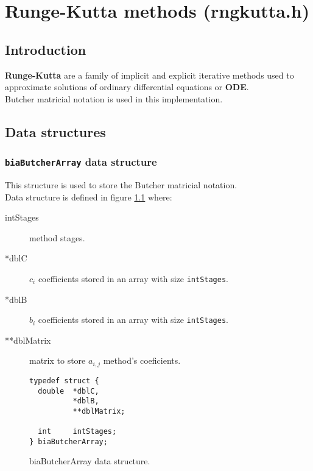 %
%

\chapter{Runge-Kutta methods (rngkutta.h)}

\section{Introduction}

\textbf{Runge-Kutta} are a family of implicit and explicit iterative methods used to approximate solutions of ordinary differential equations or \textbf{ODE}.\\

Butcher matricial notation is used in this implementation.\\

\section{Data structures}

\subsection{\texttt{biaButcherArray} data structure}

This structure is used to store the Butcher matricial notation.\\

Data structure is defined in figure \ref{fig:biaButcherArray} where:
%
\begin{description}
%
\item[intStages] method stages.
%
\item[*dblC] $c_i$ coefficients stored in an array with size \texttt{intStages}.
%
\item[*dblB] $b_i$ coefficients stored in an array with size \texttt{intStages}.
%
\item[**dblMatrix] matrix to store $a_{i,j}$ method's coeficients.  
%
\end{description}

\begin{figure}[!h]
\begin{verbatim}
typedef struct {
  double  *dblC,
          *dblB,
          **dblMatrix;

  int     intStages;
} biaButcherArray;
\end{verbatim}
\caption{biaButcherArray data structure.} \label{fig:biaButcherArray}
\end{figure}
%
\FloatBarrier


